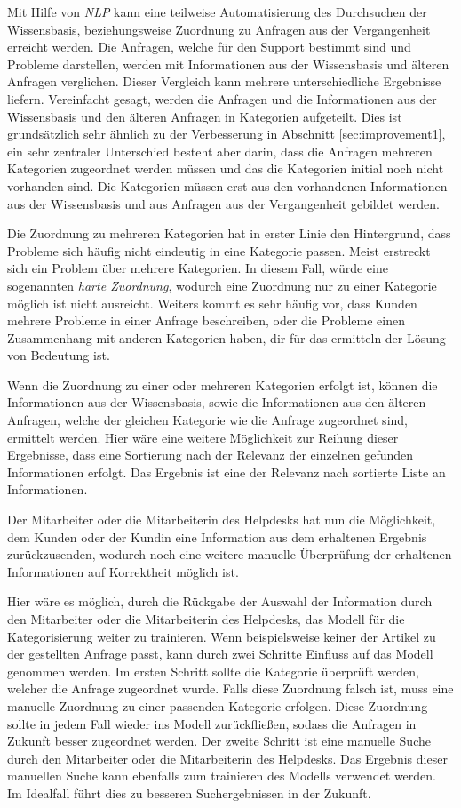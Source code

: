 Mit Hilfe von \textit{NLP} kann eine teilweise Automatisierung des Durchsuchen der Wissensbasis, beziehungsweise Zuordnung zu Anfragen aus der Vergangenheit erreicht werden. Die Anfragen, welche für den Support bestimmt sind und Probleme darstellen, werden mit Informationen aus der Wissensbasis und älteren Anfragen verglichen. Dieser Vergleich kann mehrere unterschiedliche Ergebnisse liefern. Vereinfacht gesagt, werden die Anfragen und die Informationen aus der Wissensbasis und den älteren Anfragen in Kategorien aufgeteilt. Dies ist grundsätzlich sehr ähnlich zu der Verbesserung in Abschnitt \ref{sec:improvement1}, ein sehr zentraler Unterschied besteht aber darin, dass die Anfragen mehreren Kategorien zugeordnet werden müssen und das die Kategorien initial noch nicht vorhanden sind. Die Kategorien müssen erst aus den vorhandenen Informationen aus der Wissensbasis und aus Anfragen aus der Vergangenheit gebildet werden. 

Die Zuordnung zu mehreren Kategorien hat in erster Linie den Hintergrund, dass Probleme sich häufig nicht eindeutig in eine Kategorie passen. Meist erstreckt sich ein Problem über mehrere Kategorien. In diesem Fall, würde eine sogenannten \textit{harte Zuordnung}, wodurch eine Zuordnung nur zu einer Kategorie möglich ist nicht ausreicht. Weiters kommt es sehr häufig vor, dass Kunden mehrere Probleme in einer Anfrage beschreiben, oder die Probleme einen Zusammenhang mit anderen Kategorien haben, dir für das ermitteln der Lösung von Bedeutung ist.

Wenn die Zuordnung zu einer oder mehreren Kategorien erfolgt ist, können die Informationen aus der Wissensbasis, sowie die Informationen aus den älteren Anfragen, welche der gleichen Kategorie wie die Anfrage zugeordnet sind, ermittelt werden. Hier wäre eine weitere Möglichkeit zur Reihung dieser Ergebnisse, dass eine Sortierung nach der Relevanz der einzelnen gefunden Informationen erfolgt. Das Ergebnis ist eine der Relevanz nach sortierte Liste an Informationen.

Der Mitarbeiter oder die Mitarbeiterin des Helpdesks hat nun die Möglichkeit, dem Kunden oder der Kundin eine Information aus dem erhaltenen Ergebnis zurückzusenden, wodurch noch eine weitere manuelle Überprüfung der erhaltenen Informationen auf Korrektheit möglich ist. 

Hier wäre es möglich, durch die Rückgabe der Auswahl der Information durch den Mitarbeiter oder die Mitarbeiterin des Helpdesks, das Modell für die Kategorisierung weiter zu trainieren. Wenn beispielsweise keiner der Artikel zu der gestellten Anfrage passt, kann durch zwei Schritte Einfluss auf das Modell genommen werden. Im ersten Schritt sollte die Kategorie überprüft werden, welcher die Anfrage zugeordnet wurde. Falls diese Zuordnung falsch ist, muss eine manuelle Zuordnung zu einer passenden Kategorie erfolgen. Diese Zuordnung sollte in jedem Fall wieder ins Modell zurückfließen, sodass die Anfragen in Zukunft besser zugeordnet werden. Der zweite Schritt ist eine manuelle Suche durch den Mitarbeiter oder die Mitarbeiterin des Helpdesks. Das Ergebnis dieser manuellen Suche kann ebenfalls zum trainieren des Modells verwendet werden. Im Idealfall führt dies zu besseren Suchergebnissen in der Zukunft.

